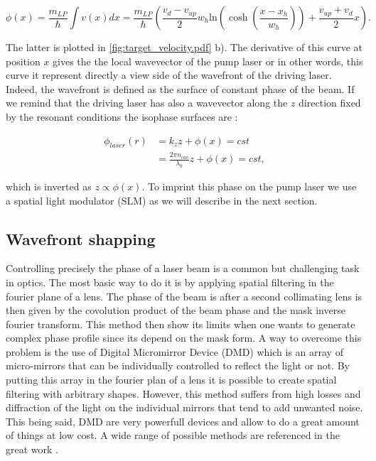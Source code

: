 \begin{equation}
    \phi(x) = \dfrac{m_{LP}}{\hbar} \int v(x) dx = \dfrac{m_{LP}}{\hbar} \left( \dfrac{v_{d}-v_{up}}{2} w_h \mathrm{ln}(\cosh(\dfrac{x-x_h}{w_h}))+\dfrac{v_{up}+v_{d}}{2}x \right).
    \label{eq:target_phase_profile}
\end{equation}

The latter is plotted in \autoref{fig:target_velocity.pdf} b). The derivative of this curve at position $x$ gives the the local wavevector of the pump laser or in other words, this curve it represent directly a view side of the wavefront of the driving laser. Indeed, the wavefront is defined as the surface of constant phase of the beam. If we remind that the driving laser has also 
a wavevector along the $z$ direction fixed by the resonant conditions the isophase surfaces are :

\begin{equation}
    \begin{align}
    \phi_{laser}(r)&=k_zz+\phi(x)=cst \\
                      &=\frac{2\pi n_{cav} }{\lambda_0}z+\phi(x)= cst,
    \end{align}
\end{equation}

which is inverted as $z\propto \phi(x)$. To imprint this phase on the pump laser we use a spatial light modulator (SLM) as we will describe in the next section.

\subsection{Wavefront shapping}

Controlling precisely the phase of a laser beam is a common but challenging task in optics. The most basic way to do it is by applying spatial filtering in the fourier plane of a lens.
The phase of the beam is after a second collimating lens is then given by the covolution product of the beam phase and the mask inverse fourier transform. This method then show its limits when one wants to 
generate complex phase profile since its depend on the mask form. A way to overcome this problem is the use of Digital Micromirror Device (DMD) which is an array of micro-mirrors that can be individually controlled to reflect the light or not.
By putting this array in the fourier plan of a lens it is possible to create spatial filtering with arbitrary shapes. However, this method suffers from high losses and diffraction of the light on the individual mirrors that tend to 
add unwanted noise. This being said, DMD are very powerfull devices and allow to do a great amount of things at low cost. A wide range of possible methods are referenced in the great work \cite{wavefront_shapping}. 

